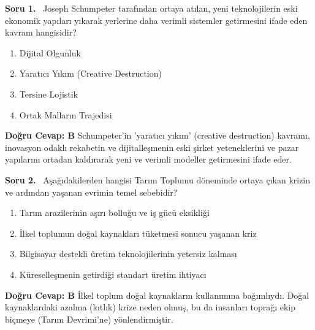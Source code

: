 \documentclass[11pt,a4paper,openany]{book}
\begin{document}
\needspace{5cm}
\vspace{8pt}
\noindent\textbf{\large\sffamily Soru 1.} \ Joseph Schumpeter tarafından ortaya atılan, yeni teknolojilerin eski ekonomik yapıları yıkarak yerlerine daha verimli sistemler getirmesini ifade eden kavram hangisidir?
\begin{enumerate}[label=\Alph*), leftmargin=25pt, topsep=4pt, itemsep=2pt]
    \item Dijital Olgunluk
    \item Yaratıcı Yıkım (Creative Destruction)
    \item Tersine Lojistik
    \item Ortak Malların Trajedisi
\end{enumerate}
\vspace{4pt}
\begin{tcolorbox}[title=Cevap ve Açıklama, colback=gray!3!white, colframe=primarycolor!90!black, arc=2mm, fonttitle=\bfseries\sffamily, top=6pt, bottom=6pt]
    \textbf{Doğru Cevap: B}
    \vspace{2pt}
    Schumpeter'in 'yaratıcı yıkım' (creative destruction) kavramı, inovasyon odaklı rekabetin ve dijitalleşmenin eski şirket yeteneklerini ve pazar yapılarını ortadan kaldırarak yeni ve verimli modeller getirmesini ifade eder.
\end{tcolorbox}
\vspace{10pt}

\needspace{5cm}
\vspace{8pt}
\noindent\textbf{\large\sffamily Soru 2.} \ Aşağıdakilerden hangisi Tarım Toplumu döneminde ortaya çıkan krizin ve ardından yaşanan evrimin temel sebebidir?
\begin{enumerate}[label=\Alph*), leftmargin=25pt, topsep=4pt, itemsep=2pt]
    \item Tarım arazilerinin aşırı bolluğu ve iş gücü eksikliği
    \item İlkel toplumun doğal kaynakları tüketmesi sonucu yaşanan kriz
    \item Bilgisayar destekli üretim teknolojilerinin yetersiz kalması
    \item Küreselleşmenin getirdiği standart üretim ihtiyacı
\end{enumerate}
\vspace{4pt}
\begin{tcolorbox}[title=Cevap ve Açıklama, colback=gray!3!white, colframe=primarycolor!90!black, arc=2mm, fonttitle=\bfseries\sffamily, top=6pt, bottom=6pt]
    \textbf{Doğru Cevap: B}
    \vspace{2pt}
    İlkel toplum doğal kaynakların kullanımına bağımlıydı. Doğal kaynaklardaki azalma (kıtlık) krize neden olmuş, bu da insanları toprağı ekip biçmeye (Tarım Devrimi'ne) yönlendirmiştir.
\end{tcolorbox}
\vspace{10pt}
\end{document}
